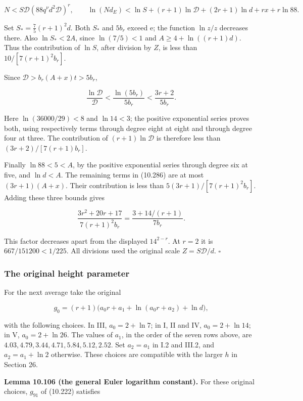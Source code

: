 \documentclass[
  11pt,
  a4paper,
]{article}
\begin{document}
\[
N<S\mathcal D(88q^\nu d^2\mathcal D)^r,
\qquad
\ln(Nd_E)<\ln S+(r+1)\ln\mathcal D
 +(2r+1)\ln d+rx+r\ln88.
\tag{10.286}
\]

Set \(S_*=\tfrac75(r+1)^2d\). Both \(S_*\) and \(5b_r\) exceed
\(\mathrm e\); the function \(\ln z/z\) decreases there. Also
\(\ln S_*<2A\), since \(\ln(7/5)<1\) and \(A\ge4+\ln((r+1)d)\). Thus the
contribution of \(\ln S\), after division by \(Z\), is less than
\(10/[7(r+1)^2b_r]\).

Since \(\mathcal D>b_r(A+x)t>5b_r\),

\[
\frac{\ln\mathcal D}{\mathcal D}
<\frac{\ln(5b_r)}{5b_r}
<\frac{3r+2}{5b_r}.
\]

Here \(\ln(36000/29)<8\) and \(\ln14<3\); the positive exponential
series proves both, using respectively terms through degree eight at
eight and through degree four at three. The contribution of
\((r+1)\ln\mathcal D\) is therefore less than \((3r+2)/[7(r+1)b_r]\).

Finally \(\ln88<5<A\), by the positive exponential series through degree
six at five, and \(\ln d<A\). The remaining terms in (10.286) are at
most \((3r+1)(A+x)\). Their contribution is less than
\(5(3r+1)/[7(r+1)^2b_r]\). Adding these three bounds gives

\[
\frac{3r^2+20r+17}{7(r+1)^2b_r}
=\frac{3+14/(r+1)}{7b_r}.
\]

This factor decreases apart from the displayed \(14^{2-r}\). At \(r=2\)
it is \(667/151200<1/225\). All divisions used the original scale
\(Z=S\mathcal D/d\). \(\square\)

\subsubsection{The original height
parameter}\label{the-original-height-parameter}

For the next average take the original

\[
g_0=(r+1)\bigl(a_0r+a_1+\ln(a_0r+a_2)+\ln d\bigr),
\tag{10.287}
\]

with the following choices. In III, \(a_0=2+\ln7\); in I, II and IV,
\(a_0=2+\ln14\); in V, \(a_0=2+\ln26\). The values of \(a_1\), in the
order of the seven rows above, are
\(4.03,4.79,3.44,4.71,5.84,5.12,2.52\). Set \(a_2=a_1\) in I.2 and
III.2, and \(a_2=a_1+\ln2\) otherwise. These choices are compatible with
the larger \(h\) in Section 26.

\textbf{Lemma 10.106 (the general Euler logarithm constant).} For these
original choices, \(g_{91}\) of (10.222) satisfies
\end{document}
